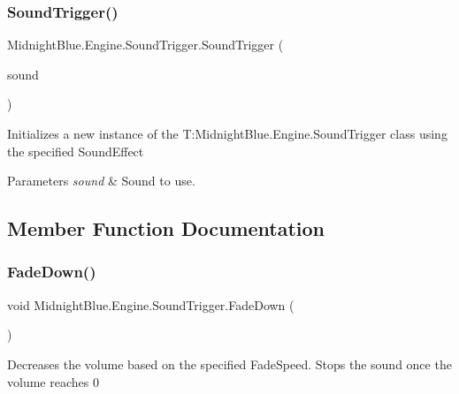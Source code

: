 \subsubsection{\texorpdfstring{Sound\+Trigger()}{SoundTrigger()}}
{\footnotesize\ttfamily Midnight\+Blue.\+Engine.\+Sound\+Trigger.\+Sound\+Trigger (\begin{DoxyParamCaption}\item[{Sound\+Effect}]{sound }\end{DoxyParamCaption})\hspace{0.3cm}{\ttfamily [inline]}}



Initializes a new instance of the T\+:\+Midnight\+Blue.\+Engine.\+Sound\+Trigger class using the specified Sound\+Effect 


\begin{DoxyParams}{Parameters}
{\em sound} & Sound to use.\\
\hline
\end{DoxyParams}


\subsection{Member Function Documentation}
\hypertarget{class_midnight_blue_1_1_engine_1_1_sound_trigger_ac3df1f278adce8dac56f94cc9de8eaca}{}\label{class_midnight_blue_1_1_engine_1_1_sound_trigger_ac3df1f278adce8dac56f94cc9de8eaca} 
\subsubsection{\texorpdfstring{Fade\+Down()}{FadeDown()}}
{\footnotesize\ttfamily void Midnight\+Blue.\+Engine.\+Sound\+Trigger.\+Fade\+Down (\begin{DoxyParamCaption}{ }\end{DoxyParamCaption})\hspace{0.3cm}{\ttfamily [inline]}}



Decreases the volume based on the specified Fade\+Speed. Stops the sound once the volume reaches 0 

